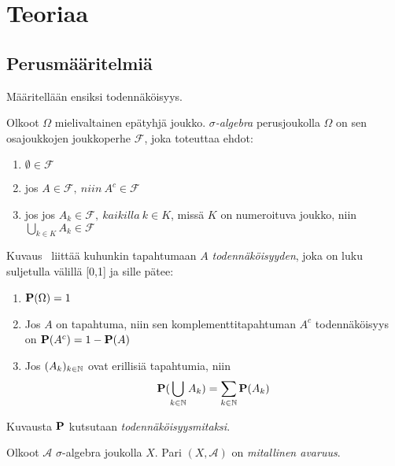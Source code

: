 


\chapter{Teoriaa}\label{teor}

\section{Perusmääritelmiä}
Määritellään ensiksi todennäköisyys. \cite{piiroinen_stokastiset_nodate, durrett_2010}

\begin{maar}
	Olkoot $\Omega$ mielivaltainen epätyhjä joukko. \emph{$\sigma$-algebra} perusjoukolla $\Omega$ on sen osajoukkojen joukkoperhe $\mathcal{F}$, joka toteuttaa ehdot:
	
	\begin{enumerate}
		\item $\emptyset\in\mathcal{F}$
		\item jos $A\in\mathcal{F},\ niin\ A^c \in\mathcal{F}$
		\item jos jos $A_k\in\mathcal{F},\ kaikilla\ k\in K$, missä $K$ on numeroituva joukko, niin $\bigcup_{k\in K} A_k \in \mathcal{F}$
	\end{enumerate}
\end{maar}

\begin{maar}
	Kuvaus \pr\ liittää kuhunkin tapahtumaan $A$ \textit{todennäköisyyden}, joka on luku suljetulla välillä [0,1] ja sille pätee:
	\begin{enumerate}
		\item $\textbf{P}(\Omega)=1$
		\item Jos $A$ on tapahtuma, niin sen komplementtitapahtuman $A^c$ todennäköisyys on $\textbf{P}(A^c)= 1 - \textbf{P}(A)$
		\item Jos $(A_k)_{k\in\mathbb{N}}$ ovat erillisiä tapahtumia, niin 
		\begin{displaymath}
			\textbf{P}(\bigcup_{k\in\mathbb{N}} A_k) = \sum_{k\in\mathbb{N}}\textbf{P}(A_k)
		\end{displaymath}
	\end{enumerate}
	Kuvausta $\textbf{P}$ kutsutaan \emph{todennäköisyysmitaksi}.
\end{maar}

\begin{maar}
	Olkoot $\mathcal{A}$ $\sigma$-algebra joukolla $X$. Pari $(X, \mathcal{A})$ on \emph{mitallinen avaruus}.
\end{maar}

